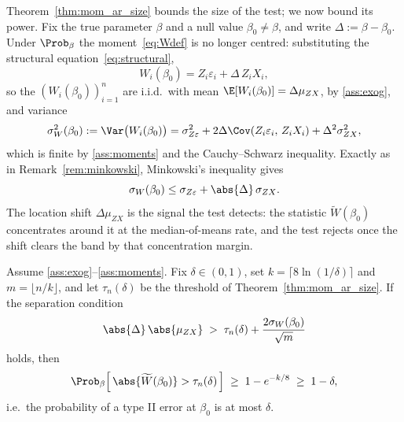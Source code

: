 Theorem~\ref{thm:mom_ar_size} bounds the size of the test; we now bound its power. Fix the true parameter $\beta$ and a null value $\beta_0 \neq \beta$, and write $\Delta := \beta - \beta_0$. Under $\Prob_\beta$ the moment~\eqref{eq:Wdef} is no longer centred: substituting the structural equation~\eqref{eq:structural},
\begin{equation}
  W_i(\beta_0) = Z_i\varepsilon_i + \Delta\, Z_iX_i,
  \label{eq:W_alt}
\end{equation}
so the $(W_i(\beta_0))_{i=1}^{n}$ are i.i.d.\ with mean $\E[W_i(\beta_0)] = \Delta\mu_{ZX}$, by \ref{ass:exog}, and variance
\begin{equation}
  \sigma_W^2(\beta_0) := \Var\bigl(W_i(\beta_0)\bigr)
  = \sigma_{Z\varepsilon}^2 + 2\Delta\Cov(Z_i\varepsilon_i,\, Z_iX_i) + \Delta^2\sigma_{ZX}^2,
  \label{eq:sigmaW}
\end{equation}
which is finite by \ref{ass:moments} and the Cauchy--Schwarz inequality. Exactly as in Remark~\ref{rem:minkowski}, Minkowski's inequality gives
\begin{equation}
  \sigma_W(\beta_0) \le \sigma_{Z\varepsilon} + \abs{\Delta}\,\sigma_{ZX}.
  \label{eq:sigmaW_mink}
\end{equation}
The location shift $\Delta\mu_{ZX}$ is the signal the test detects: the statistic $\widetilde{W}(\beta_0)$ concentrates around it at the median-of-means rate, and the test rejects once the shift clears the band by that concentration margin.

\begin{theorem}
\label{thm:mom_ar_power}
Assume \ref{ass:exog}--\ref{ass:moments}. Fix $\delta\in(0,1)$, set $k=\lceil 8\ln(1/\delta)\rceil$ and $m=\lfloor n/k\rfloor$, and let $\tau_n(\delta)$ be the threshold of Theorem~\ref{thm:mom_ar_size}. If the separation condition
\begin{equation}
  \abs{\Delta}\,\abs{\mu_{ZX}} \;>\; \tau_n(\delta) + \frac{2\sigma_W(\beta_0)}{\sqrt{m}}
  \label{eq:power_sep}
\end{equation}
holds, then
\begin{equation}
  \Prob_\beta\!\left[\,\abs{\widetilde{W}(\beta_0)} > \tau_n(\delta)\,\right] \;\ge\; 1 - e^{-k/8} \;\ge\; 1-\delta,
  \label{eq:power_bound}
\end{equation}
i.e.\ the probability of a type II error at $\beta_0$ is at most $\delta$.
\end{theorem}

